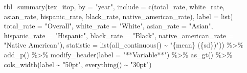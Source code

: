 \documentclass[
  letterpaper,
]{latex/krantz}
\makeatletter
\newenvironment{Shaded}{\begin{snugshade}}{\end{snugshade}}
\newcommand{\AttributeTok}[1]{\textcolor[rgb]{0.40,0.45,0.13}{#1}}
\newcommand{\FunctionTok}[1]{\textcolor[rgb]{0.28,0.35,0.67}{#1}}
\newcommand{\NormalTok}[1]{\textcolor[rgb]{0.00,0.23,0.31}{#1}}
\newcommand{\SpecialCharTok}[1]{\textcolor[rgb]{0.37,0.37,0.37}{#1}}
\newcommand{\StringTok}[1]{\textcolor[rgb]{0.13,0.47,0.30}{#1}}
\newenvironment{kframe}{%
\medskip{}
\setlength{\fboxsep}{.8em}
 \def\at@end@of@kframe{}%
 \ifinner\ifhmode%
  \def\at@end@of@kframe{\end{minipage}}%
  \begin{minipage}{\columnwidth}%
 \fi\fi%
 \def\FrameCommand##1{\hskip\@totalleftmargin \hskip-\fboxsep
 \colorbox{shadecolor}{##1}\hskip-\fboxsep
     \hskip-\linewidth \hskip-\@totalleftmargin \hskip\columnwidth}%
 \MakeFramed {\advance\hsize-\width
   \@totalleftmargin\z@ \linewidth\hsize
   \@setminipage}}%
 {\par\unskip\endMakeFramed%
 \at@end@of@kframe}
\renewenvironment{Shaded}{\begin{kframe}}{\end{kframe}}
\makeatother
\begin{document}
\begin{Shaded}
\begin{Highlighting}[]
\FunctionTok{tbl\_summary}\NormalTok{(tex\_itop, }
            \AttributeTok{by =} \StringTok{"year"}\NormalTok{,}
            \AttributeTok{include =} \FunctionTok{c}\NormalTok{(total\_rate, white\_rate, asian\_rate, }
\NormalTok{                        hispanic\_rate, black\_rate, }
\NormalTok{                        native\_american\_rate),}
            \AttributeTok{label =} \FunctionTok{list}\NormalTok{(}
              \AttributeTok{total\_rate =} \StringTok{"Overall"}\NormalTok{,}
              \AttributeTok{white\_rate =} \StringTok{"White"}\NormalTok{,}
              \AttributeTok{asian\_rate =} \StringTok{"Asian"}\NormalTok{,}
              \AttributeTok{hispanic\_rate =} \StringTok{"Hispanic"}\NormalTok{,}
              \AttributeTok{black\_rate =} \StringTok{"Black"}\NormalTok{,}
              \AttributeTok{native\_american\_rate =} \StringTok{"Native American"}\NormalTok{),}
           \AttributeTok{statistic =} \FunctionTok{list}\NormalTok{(}\FunctionTok{all\_continuous}\NormalTok{() }\SpecialCharTok{\textasciitilde{}} \StringTok{"\{mean\} (\{sd\})"}\NormalTok{)) }\SpecialCharTok{\%\textgreater{}\%} 
  \FunctionTok{add\_p}\NormalTok{() }\SpecialCharTok{\%\textgreater{}\%}
  \FunctionTok{modify\_header}\NormalTok{(}\AttributeTok{label =} \StringTok{"**Variable**"}\NormalTok{) }\SpecialCharTok{\%\textgreater{}\%}
  \FunctionTok{as\_gt}\NormalTok{() }\SpecialCharTok{\%\textgreater{}\%}
  \FunctionTok{cols\_width}\NormalTok{(label }\SpecialCharTok{\textasciitilde{}} \StringTok{"50pt"}\NormalTok{,}
             \FunctionTok{everything}\NormalTok{() }\SpecialCharTok{\textasciitilde{}} \StringTok{"30pt"}\NormalTok{)}
\end{Highlighting}
\end{Shaded}
\end{document}
